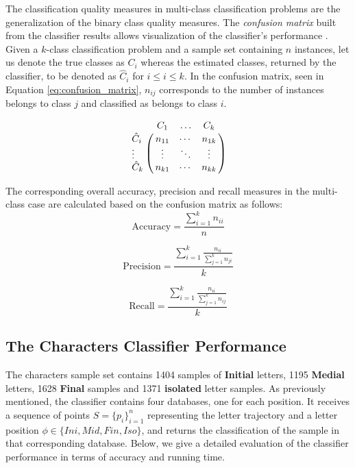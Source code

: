\iftoggle{edit-mode}{\hspace{0pt}\marginpar{Classification quality measurements - multi-class}}{}
The classification quality measures in multi-class classification problems are the generalization of the binary class quality measures.
The \emph{confusion matrix} built from the classifier results allows visualization of the classifier's performance \cite{sokolova2009systematic, labatut2012accuracy}. 
Given a $k$-class classification problem and a sample set containing $n$ instances, let us denote the true classes as $C_i$ whereas the estimated classes, returned by the classifier, to be denoted as $\hat{C}_i$ for $i\leq i \leq k$.
In the confusion matrix, seen in Equation \ref{eq:confusion_matrix}, $n_{ij}$ corresponds to the number of instances belongs to class $j$ and classified as belongs to class $i$.

\begin{equation}
\bordermatrix{ & C_1& \ldots &C_k \cr 
  \hat{C}_i & n_{11} & \cdots & n_{1k} \cr
  \vdots    & \vdots & \ddots & \vdots \cr
  \hat{C}_k & n_{k1} & \cdots & n_{kk}}
\label{eq:confusion_matrix} 
\end{equation}

The corresponding overall accuracy, precision and recall measures in the multi-class case are calculated based on the confusion matrix as follows:
\begin{equation}
\text{Accuracy}=\frac{\sum\limits_{i=1}^{k} n_{ii}}{n}
\label{eq:accuracy}
\end{equation}

\begin{equation}
\text{Precision}=\frac{\sum\limits_{i=1}^{k} \frac{n_{ii}}{\sum_{j=1}^{k} n_{ji}}}{k}
\label{eq:percision}
\end{equation}

\begin{equation}
\text{Recall}=   \frac{\sum\limits_{i=1}^{k} \frac{n_{ii}}{\sum_{j=1}^{k} n_{ij}}}{k}
\label{eq:percision}
\end{equation}

\subsection{The Characters Classifier Performance}
\iftoggle{edit-mode}{\hspace{0pt}\marginpar{The sample set}}{}
The characters sample set contains 1404 samples of \textbf{Initial} letters, 1195 \textbf{Medial} letters, 1628 \textbf{Final} samples and 1371 \textbf{isolated} letter samples.
As previously mentioned, the classifier contains four databases, one for each position. 
It receives a sequence of points $S=\{p_{i}\}_{i=1}^{n}$ representing the letter trajectory and a letter position $\phi \in \{Ini, Mid, Fin, Iso\}$, and returns the classification of the sample in that corresponding database.
Below, we give a detailed evaluation of the classifier performance in terms of accuracy and running time.

